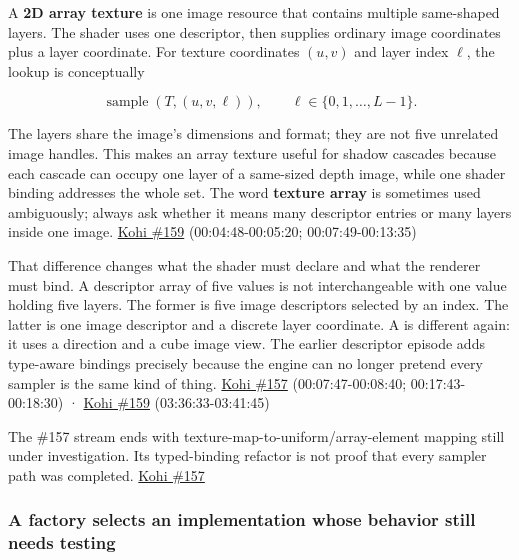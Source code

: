 A \textbf{2D array texture} is one image resource that contains multiple same-shaped layers. The shader uses one  descriptor, then supplies ordinary image coordinates plus a layer coordinate. For texture coordinates \((u,v)\) and layer index \(\ell\), the lookup is conceptually

\[\operatorname{sample}(T,(u,v,\ell)),\qquad \ell\in\{0,1,\ldots,L-1\}.\]

The layers share the image's dimensions and format; they are not five unrelated image handles. This makes an array texture useful for shadow cascades because each cascade can occupy one layer of a same-sized depth image, while one shader binding addresses the whole set. The word \textbf{texture array} is sometimes used ambiguously; always ask whether it means many descriptor entries or many layers inside one image. \href{https://www.youtube.com/watch?v=FrtHF-9K1HI}{Kohi \#159} (00:04:48-00:05:20; 00:07:49-00:13:35)

That difference changes what the shader must declare and what the renderer must bind. A descriptor array of five  values is not interchangeable with one  value holding five layers. The former is five image descriptors selected by an index. The latter is one image descriptor and a discrete layer coordinate. A  is different again: it uses a direction and a cube image view. The earlier descriptor episode adds type-aware bindings precisely because the engine can no longer pretend every sampler is the same kind of thing. \href{https://www.youtube.com/watch?v=ZmZUmsqUN6Q}{Kohi \#157} (00:07:47-00:08:40; 00:17:43-00:18:30) · \href{https://www.youtube.com/watch?v=FrtHF-9K1HI}{Kohi \#159} (03:36:33-03:41:45)

The \#157 stream ends with texture-map-to-uniform/array-element mapping still under investigation. Its typed-binding refactor is not proof that every sampler path was completed. \href{https://www.youtube.com/watch?v=ZmZUmsqUN6Q}{Kohi \#157}

\subsubsection{A factory selects an implementation whose behavior still needs testing}\label{06-engine-ii-ch025-a-factory-selects-an-implementation-whose-behavior-still-needs-testing}

\hypertarget{06-engine-ii-ch025-a-factory-selects-an-implementation-whose-behavior-still-needs-testing}{}

